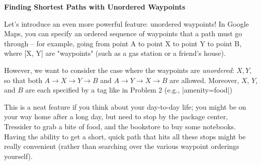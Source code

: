 \item {\bf Finding Shortest Paths with Unordered Waypoints}

Let's introduce an even more powerful feature: unordered waypoints! In Google Maps, you can specify an ordered sequence of waypoints that a path must go through – for example, going from point A to point X to point Y to point B, where [X, Y] are "waypoints" (such as a gas station or a friend's house).

However, we want to consider the case where the waypoints are \textit{unordered}: ${X, Y}$, so that both $A \rightarrow X \rightarrow Y \rightarrow B$ and $A \rightarrow Y \rightarrow X \rightarrow B$ are allowed. Moreover, $X$, $Y$, and $B$ are each specified by a tag like in Problem 2 (e.g., |amenity=food|)

This is a neat feature if you think about your day-to-day life; you might be on your way home after a long day, but need to stop by the package center, Tressider to grab a bite of food, and the bookstore to buy some notebooks. Having the ability to get a short, quick path that hits all these stops might be really convenient (rather than searching over the various waypoint orderings yourself).

\begin{enumerate}

  

  

  

  

\end{enumerate}
